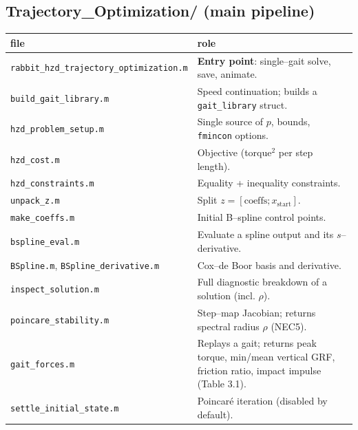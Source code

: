 \documentclass[11pt,a4paper]{article}
\newcommand{\code}[1]{\texttt{#1}}          %
\newcommand{\fname}[1]{\texttt{#1}}          %
\begin{document}
\subsection*{Trajectory\_Optimization/ (main pipeline)}
\begin{longtable}{@{}L{4.7cm} L{9.5cm}@{}}
\toprule file & role \\ \midrule \endhead
\fname{rabbit\_hzd\_trajectory\_optimization.m} & \textbf{Entry point}: single--gait solve, save, animate. \\
\fname{build\_gait\_library.m} & Speed continuation; builds a \code{gait\_library} struct. \\
\fname{hzd\_problem\_setup.m} & Single source of $p$, bounds, \code{fmincon} options. \\
\fname{hzd\_cost.m} & Objective (torque$^2$ per step length). \\
\fname{hzd\_constraints.m} & Equality + inequality constraints. \\
\fname{unpack\_z.m} & Split $z=[\text{coeffs};x_{\text{start}}]$. \\
\fname{make\_coeffs.m} & Initial B--spline control points. \\
\fname{bspline\_eval.m} & Evaluate a spline output and its $s$--derivative. \\
\fname{BSpline.m}, \fname{BSpline\_derivative.m} & Cox--de Boor basis and derivative. \\
\fname{inspect\_solution.m} & Full diagnostic breakdown of a solution (incl. $\rho$). \\
\fname{poincare\_stability.m} & Step--map Jacobian; returns spectral radius $\rho$ (NEC5). \\
\fname{gait\_forces.m} & Replays a gait; returns peak torque, min/mean vertical GRF, friction ratio, impact impulse (Table 3.1). \\
\fname{settle\_initial\_state.m} & Poincar\'e iteration (disabled by default). \\
\bottomrule
\end{longtable}
\end{document}
